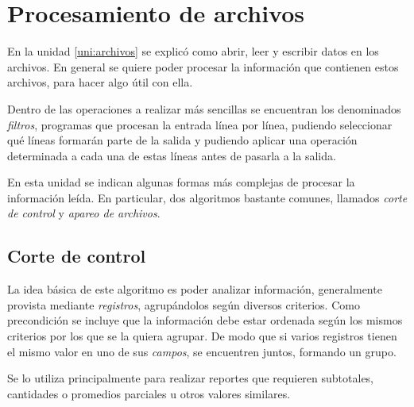 
%

\chapter{Procesamiento de archivos}

En la unidad \ref{uni:archivos} se explicó como abrir, leer y escribir datos en
los archivos.  En general se quiere poder procesar la información que contienen
estos archivos, para hacer algo útil con ella.

Dentro de las operaciones a realizar más sencillas se encuentran los
denominados {\it filtros}, programas que procesan la entrada línea por
línea, pudiendo seleccionar qué líneas formarán parte de la salida y
pudiendo aplicar una operación determinada a cada una de estas líneas antes
de pasarla a la salida.

En esta unidad se indican algunas formas más complejas de procesar la
información leída.  En particular, dos algoritmos bastante comunes, llamados
\textit {corte de control} y \textit{apareo de archivos}.

\section{Corte de control}

La idea básica de este algoritmo es poder analizar información, generalmente
provista mediante \textit{registros}, agrupándolos según diversos criterios.
Como precondición se incluye que la información debe estar ordenada según
los mismos criterios por los que se la quiera agrupar. De modo que si
varios registros tienen el mismo valor en uno de sus \textit{campos}, se
encuentren juntos, formando un grupo.

Se lo utiliza principalmente para realizar reportes que requieren
subtotales, cantidades o promedios parciales u otros valores similares.


